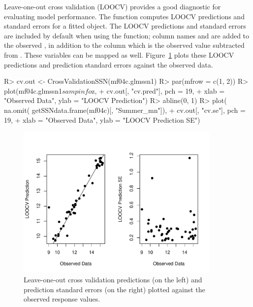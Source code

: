 \documentclass[nojss]{jss}
\renewenvironment{Schunk}{\vspace{\topsep}}{\vspace{\topsep}}
\begin{document}
Leave-one-out cross validation (LOOCV) provides a good diagnostic for
evaluating model performance. The function 
computes LOOCV predictions and standard errors for a fitted
 object. The LOOCV predictions and standard errors are
included by default when using the  function; column
names  and  are added to
the observed  , in addition to the
column  which is the observed value subtracted
from . These variables can be mapped as
well. Figure~\ref{LOOCV} plots these LOOCV predictions and prediction
standard errors against the observed data.

\begin{Schunk}
\begin{Sinput}
R> cv.out <- CrossValidationSSN(mf04c.glmssn1)
R> par(mfrow = c(1, 2))
R> plot(mf04c.glmssn1$sampinfo$z,
+     cv.out[, "cv.pred"], pch = 19,
+     xlab = "Observed Data", ylab = "LOOCV Prediction")
R> abline(0, 1)
R> plot( na.omit( getSSNdata.frame(mf04c)[, "Summer_mn"]),
+     cv.out[, "cv.se"], pch = 19,
+     xlab = "Observed Data", ylab = "LOOCV Prediction SE")
\end{Sinput}
\end{Schunk}

\begin{figure}[htbp]
  \begin{center}
    \includegraphics[keepaspectratio=true, width = 100mm]{Figures/jss984Fig-LOOCV}
    \caption{Leave-one-out cross validation predictions (on the left) and prediction
      standard errors (on the right) plotted against the observed response
      values.\label{LOOCV}}
  \end{center}
\end{figure}
\end{document}
